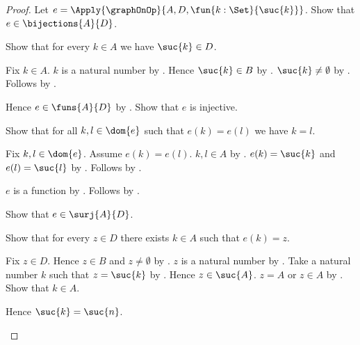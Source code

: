 \begin{proof}
    Let $e=\Apply{\graphOnOp}{
        A,D,\fun{k:\Set}{\suc{k}}}$.
    Show that $e\in\bijections{A}{D}$.
    \begin{subproof}
        Show that for every $k\in A$ we have $\suc{k}\in D$.
        \begin{subproof}
            Fix $k\in A$.
            $k$ is a natural number by
                .
            Hence $\suc{k}\in B$ by
                .
            $\suc{k}\neq\emptyset$ by .
            Follows by .
        \end{subproof}
        Hence $e\in\funs{A}{D}$ by
            .
        Show that $e$ is injective.
        \begin{subproof}
            Show that for all $k,l\in\dom{e}$ such that
                $e(k)=e(l)$ we have $k=l$.
            \begin{subproof}
                Fix $k,l\in\dom{e}$.
                Assume $e(k)=e(l)$.
                $k,l\in A$ by .
                $e(k)=\suc{k}$ and $e(l)=\suc{l}$ by
                    .
                Follows by .
            \end{subproof}
            $e$ is a function by .
            Follows by .
        \end{subproof}
        Show that $e\in\surj{A}{D}$.
        \begin{subproof}
            Show that for every $z\in D$ there exists $k\in A$
                such that $e(k)=z$.
            \begin{subproof}
                Fix $z\in D$.
                Hence $z\in B$ and $z\neq\emptyset$ by
                    .
                $z$ is a natural number by
                    .
                Take a natural number $k$ such that $z=\suc{k}$ by
                    .
                Hence $z\in\suc{A}$.
                $z=A$ or $z\in A$ by .
                Show that $k\in A$.
                \begin{subproof}
                    \begin{byCase}
                            Hence $\suc{k}=\suc{n}$.

\end{byCase}
\end{subproof}
\end{subproof}
\end{subproof}
\end{subproof}
\end{proof}
